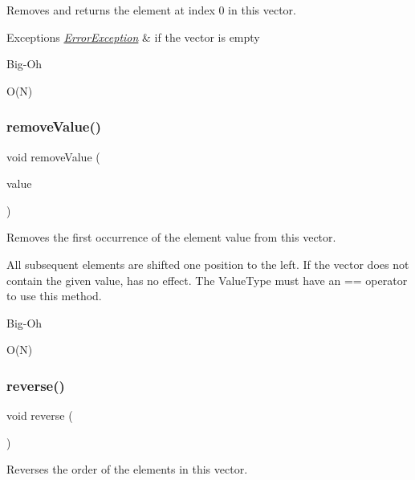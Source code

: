 Removes and returns the element at index 0 in this vector. 


\begin{DoxyExceptions}{Exceptions}
{\em \mbox{\hyperlink{classErrorException}{Error\+Exception}}} & if the vector is empty \\
\hline
\end{DoxyExceptions}
\begin{DoxyRefDesc}{Big-\/\+Oh}
\item[\mbox{\hyperlink{BigOh__BigOh000127}{Big-\/\+Oh}}]O(\+N) \end{DoxyRefDesc}
\mbox{\label{classVector_a10e8154a489093d2b1f20596342bcd78}} 
\subsubsection{\texorpdfstring{remove\+Value()}{removeValue()}}
{\footnotesize\ttfamily void remove\+Value (\begin{DoxyParamCaption}\item[{const Value\+Type \&}]{value }\end{DoxyParamCaption})}



Removes the first occurrence of the element value from this vector. 

All subsequent elements are shifted one position to the left. If the vector does not contain the given value, has no effect. The Value\+Type must have an == operator to use this method. \begin{DoxyRefDesc}{Big-\/\+Oh}
\item[\mbox{\hyperlink{BigOh__BigOh000129}{Big-\/\+Oh}}]O(\+N) \end{DoxyRefDesc}
\mbox{\label{classVector_a310c0bebc002158f5646a91d60e4dc89}} 
\subsubsection{\texorpdfstring{reverse()}{reverse()}}
{\footnotesize\ttfamily void reverse (\begin{DoxyParamCaption}{ }\end{DoxyParamCaption})}



Reverses the order of the elements in this vector. 

